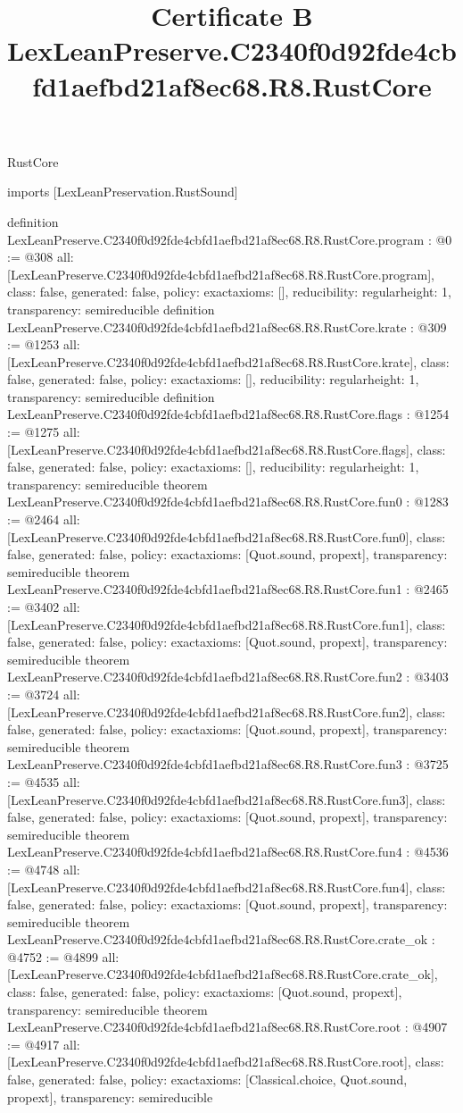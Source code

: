 \begin{lexlean}{RustCore}
\title{Certificate B LexLeanPreserve.C2340f0d92fde4cbfd1aefbd21af8ec68.R8.RustCore}
\begin{coremodule}
imports [LexLeanPreservation.RustSound]

definition LexLeanPreserve.C2340f0d92fde4cbfd1aefbd21af8ec68.R8.RustCore.program : @0 := @308 {
  all: [LexLeanPreserve.C2340f0d92fde4cbfd1aefbd21af8ec68.R8.RustCore.program],
  class: false,
  generated: false,
  policy: exact{axioms: []},
  reducibility: regular{height: 1},
  transparency: semireducible
}
definition LexLeanPreserve.C2340f0d92fde4cbfd1aefbd21af8ec68.R8.RustCore.krate : @309 := @1253 {
  all: [LexLeanPreserve.C2340f0d92fde4cbfd1aefbd21af8ec68.R8.RustCore.krate],
  class: false,
  generated: false,
  policy: exact{axioms: []},
  reducibility: regular{height: 1},
  transparency: semireducible
}
definition LexLeanPreserve.C2340f0d92fde4cbfd1aefbd21af8ec68.R8.RustCore.flags : @1254 := @1275 {
  all: [LexLeanPreserve.C2340f0d92fde4cbfd1aefbd21af8ec68.R8.RustCore.flags],
  class: false,
  generated: false,
  policy: exact{axioms: []},
  reducibility: regular{height: 1},
  transparency: semireducible
}
theorem LexLeanPreserve.C2340f0d92fde4cbfd1aefbd21af8ec68.R8.RustCore.fun0 : @1283 := @2464 {
  all: [LexLeanPreserve.C2340f0d92fde4cbfd1aefbd21af8ec68.R8.RustCore.fun0],
  class: false,
  generated: false,
  policy: exact{axioms: [Quot.sound, propext]},
  transparency: semireducible
}
theorem LexLeanPreserve.C2340f0d92fde4cbfd1aefbd21af8ec68.R8.RustCore.fun1 : @2465 := @3402 {
  all: [LexLeanPreserve.C2340f0d92fde4cbfd1aefbd21af8ec68.R8.RustCore.fun1],
  class: false,
  generated: false,
  policy: exact{axioms: [Quot.sound, propext]},
  transparency: semireducible
}
theorem LexLeanPreserve.C2340f0d92fde4cbfd1aefbd21af8ec68.R8.RustCore.fun2 : @3403 := @3724 {
  all: [LexLeanPreserve.C2340f0d92fde4cbfd1aefbd21af8ec68.R8.RustCore.fun2],
  class: false,
  generated: false,
  policy: exact{axioms: [Quot.sound, propext]},
  transparency: semireducible
}
theorem LexLeanPreserve.C2340f0d92fde4cbfd1aefbd21af8ec68.R8.RustCore.fun3 : @3725 := @4535 {
  all: [LexLeanPreserve.C2340f0d92fde4cbfd1aefbd21af8ec68.R8.RustCore.fun3],
  class: false,
  generated: false,
  policy: exact{axioms: [Quot.sound, propext]},
  transparency: semireducible
}
theorem LexLeanPreserve.C2340f0d92fde4cbfd1aefbd21af8ec68.R8.RustCore.fun4 : @4536 := @4748 {
  all: [LexLeanPreserve.C2340f0d92fde4cbfd1aefbd21af8ec68.R8.RustCore.fun4],
  class: false,
  generated: false,
  policy: exact{axioms: [Quot.sound, propext]},
  transparency: semireducible
}
theorem LexLeanPreserve.C2340f0d92fde4cbfd1aefbd21af8ec68.R8.RustCore.crate_ok : @4752 := @4899 {
  all: [LexLeanPreserve.C2340f0d92fde4cbfd1aefbd21af8ec68.R8.RustCore.crate_ok],
  class: false,
  generated: false,
  policy: exact{axioms: [Quot.sound, propext]},
  transparency: semireducible
}
theorem LexLeanPreserve.C2340f0d92fde4cbfd1aefbd21af8ec68.R8.RustCore.root : @4907 := @4917 {
  all: [LexLeanPreserve.C2340f0d92fde4cbfd1aefbd21af8ec68.R8.RustCore.root],
  class: false,
  generated: false,
  policy: exact{axioms: [Classical.choice, Quot.sound, propext]},
  transparency: semireducible
}


\end{coremodule}
\end{lexlean}
